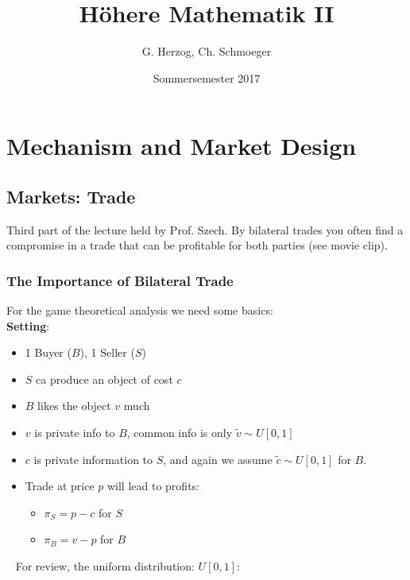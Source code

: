 \documentclass[12pt]{extreport} %
\title{Höhere Mathematik II}
\author{G. Herzog, Ch. Schmoeger}
\date{Sommersemester 2017}
\theoremstyle{named}
\theoremstyle{nnamed}
\theoremstyle{itshape}
\theoremstyle{normal}
\begin{document}
	
  

\chapter*{Mechanism and Market Design}  
  
\section*{Markets: Trade}

Third part of the lecture held by Prof. Szech. By bilateral trades you often find a compromise in a trade that can be profitable for both parties (see movie clip).

\subsection*{The Importance of Bilateral Trade}

For the game theoretical analysis we need some basics: ~\\

\textbf{Setting}:
 
\begin{itemize}
	\item 1 Buyer ($B$), 1 Seller ($S$)
	\item $S$ ca produce an object of cost $c$
	\item $B$ likes the object $v$ much
	\item $v$ is private info to $B$, common info is only $\tilde{v} \sim U[0, 1]$
	\item $c$ is private information to $S$, and again we assume $\tilde{c} \sim U[0, 1]$ for $B$.
	\item Trade at price $p$ will lead to profits:
		\begin{itemize}
			\item $\pi_{S} = p - c$ for $S$
			\item $\pi_{B} = v - p$ for $B$
		\end{itemize}
\end{itemize}
~\newpage
For review, the uniform distribution: $U[0, 1]$:
\end{document}
